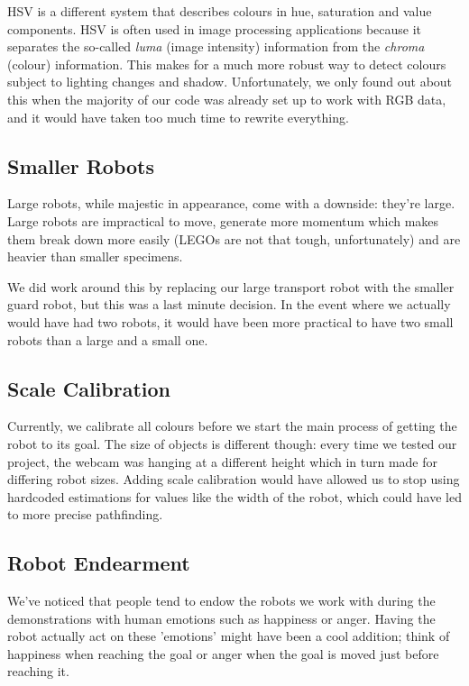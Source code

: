 \documentclass[10pt, abstracton, twocolumn]{scrartcl}
\begin{document}
\begin{appendices}
HSV is a different system that describes colours in hue, saturation and value components. HSV is often used in image processing applications because it separates the so-called \textit{luma} (image intensity) information from the \textit{chroma} (colour) information. This makes for a much more robust way to detect colours subject to lighting changes and shadow. Unfortunately, we only found out about this when the majority of our code was already set up to work with RGB data, and it would have taken too much time to rewrite everything.

\subsection{Smaller Robots}
Large robots, while majestic in appearance, come with a downside: they're large. Large robots are impractical to move, generate more momentum which makes them break down more easily (LEGOs are not that tough, unfortunately) and are heavier than smaller specimens. 

We did work around this by replacing our large transport robot with the smaller guard robot, but this was a last minute decision. In the event where we actually would have had two robots, it would have been more practical to have two small robots than a large and a small one.

\subsection{Scale Calibration}
Currently, we calibrate all colours before we start the main process of getting the robot to its goal. The size of objects is different though: every time we tested our project, the webcam was hanging at a different height which in turn made for differing robot sizes. Adding scale calibration would have allowed us to stop using hardcoded estimations for values like the width of the robot, which could have led to more precise pathfinding.

\subsection{Robot Endearment}
We've noticed that people tend to endow the robots we work with during the demonstrations with human emotions such as happiness or anger. Having the robot actually act on these 'emotions' might have been a cool addition; think of happiness when reaching the goal or anger when the goal is moved just before reaching it.


\end{appendices}
\end{document}
